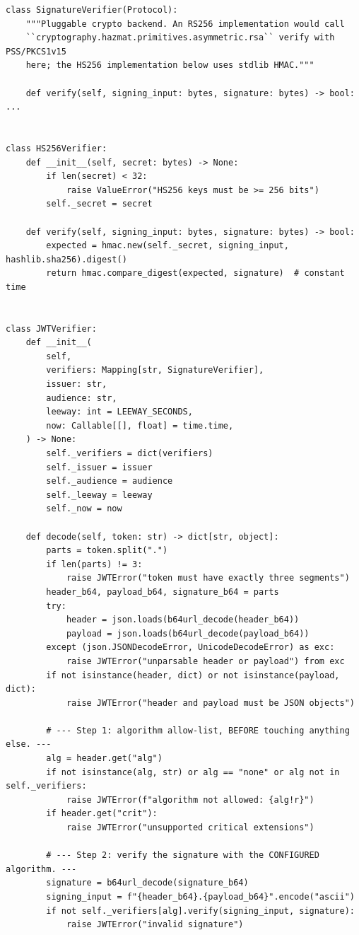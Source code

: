\begin{verbatim}
class SignatureVerifier(Protocol):
    """Pluggable crypto backend. An RS256 implementation would call
    ``cryptography.hazmat.primitives.asymmetric.rsa`` verify with PSS/PKCS1v15
    here; the HS256 implementation below uses stdlib HMAC."""

    def verify(self, signing_input: bytes, signature: bytes) -> bool: ...


class HS256Verifier:
    def __init__(self, secret: bytes) -> None:
        if len(secret) < 32:
            raise ValueError("HS256 keys must be >= 256 bits")
        self._secret = secret

    def verify(self, signing_input: bytes, signature: bytes) -> bool:
        expected = hmac.new(self._secret, signing_input, hashlib.sha256).digest()
        return hmac.compare_digest(expected, signature)  # constant time


class JWTVerifier:
    def __init__(
        self,
        verifiers: Mapping[str, SignatureVerifier],
        issuer: str,
        audience: str,
        leeway: int = LEEWAY_SECONDS,
        now: Callable[[], float] = time.time,
    ) -> None:
        self._verifiers = dict(verifiers)
        self._issuer = issuer
        self._audience = audience
        self._leeway = leeway
        self._now = now

    def decode(self, token: str) -> dict[str, object]:
        parts = token.split(".")
        if len(parts) != 3:
            raise JWTError("token must have exactly three segments")
        header_b64, payload_b64, signature_b64 = parts
        try:
            header = json.loads(b64url_decode(header_b64))
            payload = json.loads(b64url_decode(payload_b64))
        except (json.JSONDecodeError, UnicodeDecodeError) as exc:
            raise JWTError("unparsable header or payload") from exc
        if not isinstance(header, dict) or not isinstance(payload, dict):
            raise JWTError("header and payload must be JSON objects")

        # --- Step 1: algorithm allow-list, BEFORE touching anything else. ---
        alg = header.get("alg")
        if not isinstance(alg, str) or alg == "none" or alg not in self._verifiers:
            raise JWTError(f"algorithm not allowed: {alg!r}")
        if header.get("crit"):
            raise JWTError("unsupported critical extensions")

        # --- Step 2: verify the signature with the CONFIGURED algorithm. ---
        signature = b64url_decode(signature_b64)
        signing_input = f"{header_b64}.{payload_b64}".encode("ascii")
        if not self._verifiers[alg].verify(signing_input, signature):
            raise JWTError("invalid signature")


\end{verbatim}
